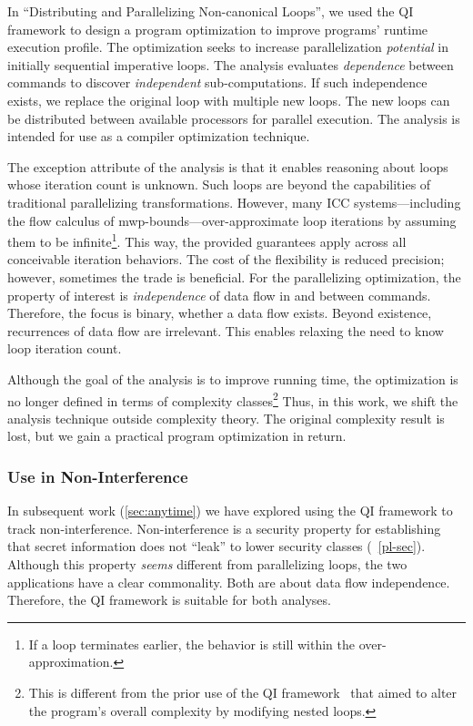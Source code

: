 In \enquote{Distributing and Parallelizing Non-canonical Loops},
we used the QI framework to design a program optimization to improve programs' runtime execution profile.
The optimization seeks to increase parallelization \emph{potential} in initially sequential imperative loops.
The analysis evaluates \emph{dependence} between commands to discover \emph{independent} sub-computations.
If such independence exists, we replace the original loop with multiple new loops.
The new loops can be distributed between available processors for parallel execution.
The analysis is intended for use as a compiler optimization technique.

The exception attribute of the analysis is that it enables reasoning about
loops whose iteration count is unknown.
Such loops are beyond the capabilities of traditional parallelizing transformations.
However, many ICC systems---including the flow calculus of mwp-bounds---over-approximate loop iterations by assuming them to be infinite\footnote{If a loop terminates earlier, the behavior is still within the over-approximation.}.
This way, the provided guarantees apply across all conceivable iteration behaviors.
The cost of the flexibility is reduced precision;
however, sometimes the trade is beneficial.
For the parallelizing optimization, the property of interest is \emph{independence} of data flow in and between commands.
Therefore, the focus is binary, \ie whether a data flow exists.
Beyond existence, recurrences of data flow are irrelevant.
This enables relaxing the need to know loop iteration count.

Although the goal of the analysis is to improve running time,
the optimization is no longer defined in terms of complexity classes\footnote{
This is different from the prior use of the QI framework~\cite{moyen20172}
that aimed to alter the program's overall complexity by modifying nested loops.}
Thus, in this work, we shift the analysis technique outside complexity theory.
The original complexity result is lost, but we gain a practical program optimization in return.

\subsubsection{Use in Non-Interference}
\label{subsubsec:qi-ni}

In subsequent work (\autoref{sec:anytime}) we have explored  using the QI framework to track non-interference.
Non-interference is a security property for establishing that secret information does not \enquote{leak} to lower security classes (\cf~\autoref{pl-sec}).
Although this property \emph{seems} different from parallelizing loops, the two applications have a clear commonality.
Both are about data flow independence.
Therefore, the QI framework is suitable for both analyses.

